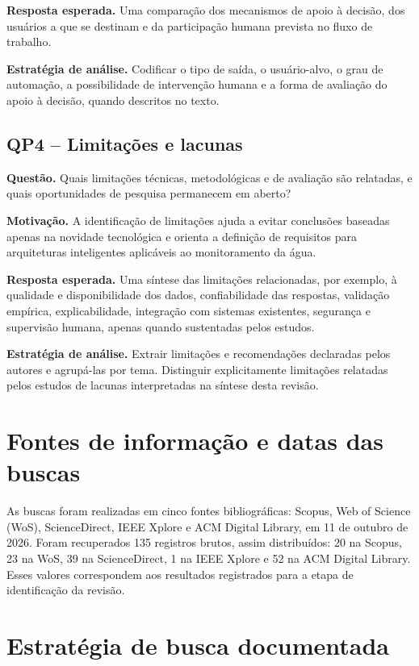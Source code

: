 \textbf{Resposta esperada.} Uma comparação dos mecanismos de apoio à decisão,
dos usuários a que se destinam e da participação humana prevista no fluxo de
trabalho.

\textbf{Estratégia de análise.} Codificar o tipo de saída, o usuário-alvo, o
grau de automação, a possibilidade de intervenção humana e a forma de avaliação
do apoio à decisão, quando descritos no texto.

\subsection{QP4 -- Limitações e lacunas}

\textbf{Questão.} Quais limitações técnicas, metodológicas e de avaliação são
relatadas, e quais oportunidades de pesquisa permanecem em aberto?

\textbf{Motivação.} A identificação de limitações ajuda a evitar conclusões
baseadas apenas na novidade tecnológica e orienta a definição de requisitos
para arquiteturas inteligentes aplicáveis ao monitoramento da água.

\textbf{Resposta esperada.} Uma síntese das limitações relacionadas, por
exemplo, à qualidade e disponibilidade dos dados, confiabilidade das respostas,
validação empírica, explicabilidade, integração com sistemas existentes,
segurança e supervisão humana, apenas quando sustentadas pelos estudos.

\textbf{Estratégia de análise.} Extrair limitações e recomendações declaradas
pelos autores e agrupá-las por tema. Distinguir explicitamente limitações
relatadas pelos estudos de lacunas interpretadas na síntese desta revisão.

\section{Fontes de informação e datas das buscas}

As buscas foram realizadas em cinco fontes bibliográficas: Scopus,
Web of Science (WoS), ScienceDirect, IEEE Xplore e ACM Digital Library,
em 11 de outubro de 2026. Foram recuperados 135 registros brutos, assim
distribuídos: 20 na Scopus, 23 na WoS, 39 na ScienceDirect, 1 na IEEE
Xplore e 52 na ACM Digital Library. Esses valores correspondem aos
resultados registrados para a etapa de identificação da revisão.

\section{Estratégia de busca documentada}

